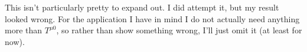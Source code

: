 This isn't particularly pretty to expand out.  I did attempt it, but my result looked wrong.  For the application I have in mind I do not actually need anything more than $T^{\mu 0}$, so rather than show something wrong, I'll just omit it (at least for now).
%
%
%
%
%
